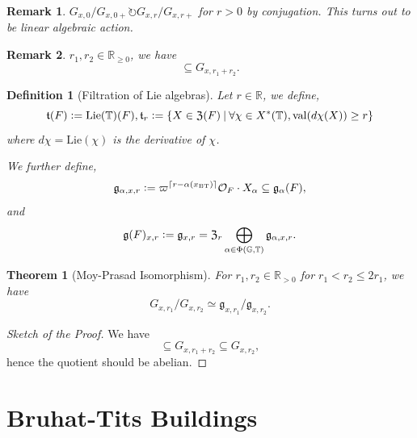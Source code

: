 \documentclass[10pt]{article}
\newtheorem{theorem}{Theorem} [section]
\newtheorem{definition}{Definition}[section]
\newtheorem{remark}{Remark}[section]
\numberwithin{equation}{theorem}
\newcommand{\defeq}{\vcentcolon=}
\newcommand{\bR}[0]{\mathbb{R}}
\newcommand{\Ouv}[0]{\mathcal{O}}
\newcommand{\G}[0]{\mathbb{G}}
\newcommand{\Lie}[0]{\mathrm{Lie}}
\newcommand{\BT}[0]{\mathrm{BT}}
\newcommand{\val}[0]{\mathrm{val}}
\newcommand{\bT}[0]{\mathbb{T}}
\newcommand{\g}[0]{\mathfrak{g}}
\newcommand{\sep}[0]{\:|\:}
\begin{document}
\begin{remark}
    $G_{x,0}/G_{x,0+}\circlearrowright G_{x,r}/G_{x,r+}$ for $r>0$ by conjugation. This turns out to be linear algebraic action.
\end{remark}

\begin{remark}
    $r_1,r_2\in \bR_{\geq0}$, we have 
    \begin{equation*}
        [G_{x,r_1},G_{x,r_2}]\subseteq G_{x,r_1+r_2}.
    \end{equation*}
\end{remark}

\begin{definition}[Filtration of Lie algebras]
    Let $r\in \bR$, we define,
    \begin{equation*}
        \mathfrak{t}(F) \defeq\Lie(\bT)(F),\mathfrak{t}_r\defeq \{X\in\mathfrak{Z}(F)\sep \forall \chi\in X^*(\bT),\val(d\chi(X))\geq r\}
    \end{equation*}
    where $d\chi=\Lie(\chi)$ is the derivative of $\chi$.
    \par We further define,
    \begin{equation*}
        \g_{\alpha,x,r}\defeq\varpi^{\lceil r-\alpha(x_\BT)\rceil}\Ouv_F\cdot X_\alpha\subseteq\g_\alpha(F),
    \end{equation*}
    and 
    \begin{equation*}
        \g(F)_{x,r} \defeq \g_{x,r} =\mathfrak{Z}_r\bigoplus_{\alpha\in\Phi(\G,\bT)}\g_{\alpha,x,r}.
    \end{equation*}
\end{definition}

\begin{theorem}[Moy-Prasad Isomorphism]
    For $r_1,r_2\in\bR_{>0}$ for $r_1<r_2\leq 2r_1$, we have 
    \begin{equation*}
        G_{x,r_1}/G_{x,r_2}\simeq \g_{x,r_1}/\g_{x,r_2}.
    \end{equation*}
\end{theorem}
\begin{proof}[Sketch of the Proof]
    We have 
    \begin{equation*}
        [G_{x,r_1},G_{x,r_1}]\subseteq G_{x,r_1+r_2}\subseteq G_{x,r_2},
    \end{equation*}
    hence the quotient should be abelian.
\end{proof}

\section{Bruhat-Tits Buildings}
\end{document}
